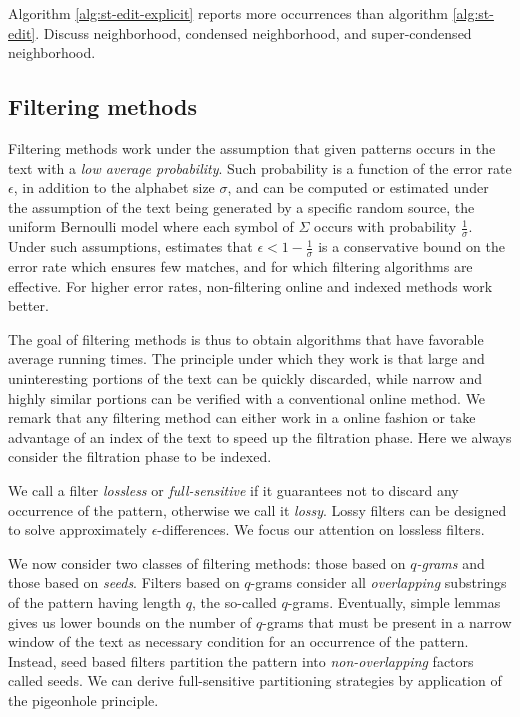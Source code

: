Algorithm \ref{alg:st-edit-explicit} reports more occurrences than algorithm \ref{alg:st-edit}.
Discuss neighborhood, condensed neighborhood, and super-condensed neighborhood.


\subsection{Filtering methods}

Filtering methods work under the assumption that given patterns occurs in the text with a \emph{low average probability}.
Such probability is a function of the error rate $\epsilon$, in addition to the alphabet size $\sigma$, and can be computed or estimated under the assumption of the text being generated by a specific random source, \eg the uniform Bernoulli model where each symbol of $\Sigma$ occurs with probability $\frac{1}{\sigma}$.
Under such assumptions, \citep{Navarro2000} estimates that $\epsilon < 1 - \frac{1}{\sigma}$ is a conservative bound on the error rate which ensures few matches, and for which filtering algorithms are effective.
For higher error rates, non-filtering online and indexed methods work better.

The goal of filtering methods is thus to obtain algorithms that have favorable average running times.
The principle under which they work is that large and uninteresting portions of the text can be quickly discarded, while narrow and highly similar portions can be verified with a conventional online method.
We remark that any filtering method can either work in a online fashion or take advantage of an index of the text to speed up the filtration phase.
Here we always consider the filtration phase to be indexed.

We call a filter \emph{lossless} or \emph{full-sensitive} if it guarantees not to discard any occurrence of the pattern, otherwise we call it \emph{lossy}.
Lossy filters can be designed to solve approximately $\epsilon$-differences.
We focus our attention on lossless filters. 

We now consider two classes of filtering methods: those based on \emph{$q$-grams} and those based on \emph{seeds}.
Filters based on $q$-grams consider all \emph{overlapping} substrings of the pattern having length $q$, the so-called $q$-grams. Eventually, simple lemmas gives us lower bounds on the number of $q$-grams that must be present in a narrow window of the text as necessary condition for an occurrence of the pattern.
Instead, seed based filters partition the pattern into \emph{non-overlapping} factors called seeds.
We can derive full-sensitive partitioning strategies by application of the pigeonhole principle.

